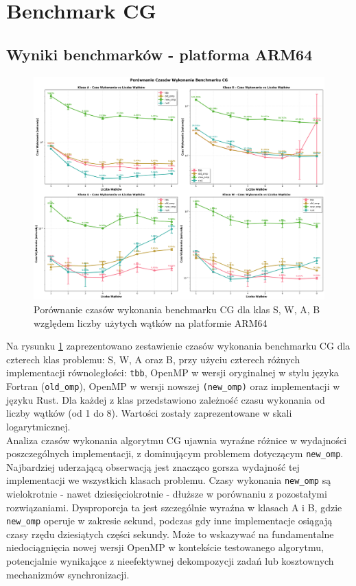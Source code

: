 
\section{Benchmark CG}
\subsection{Wyniki benchmarków - platforma ARM64}

\begin{figure}[H]
    \centering
    \includegraphics[width=\textwidth]{analiza/images/parallel/cg/arm/cg_porownanie_czasow_wykonania.png}
    \caption{Porównanie czasów wykonania benchmarku CG dla klas S, W, A, B względem liczby użytych wątków na platformie ARM64}
    \label{cg_porownanie_czasow_wykonania}
\end{figure}

Na rysunku \ref{cg_porownanie_czasow_wykonania} zaprezentowano zestawienie czasów wykonania benchmarku CG dla czterech klas problemu: S, W, A oraz B, przy użyciu czterech różnych implementacji równoległości: \texttt{tbb}, OpenMP w wersji oryginalnej w stylu języka Fortran (\texttt{old\_omp}), OpenMP w wersji nowszej \texttt{(\texttt{new\_omp})} oraz implementacji w języku Rust. Dla każdej z klas przedstawiono zależność czasu wykonania od liczby wątków (od 1 do 8). Wartości zostały zaprezentowane w skali logarytmicznej.\\
Analiza czasów wykonania algorytmu CG ujawnia wyraźne różnice w wydajności poszczególnych implementacji, z dominującym problemem dotyczącym \texttt{new\_omp}. Najbardziej uderzającą obserwacją jest znacząco gorsza wydajność tej implementacji we wszystkich klasach problemu. Czasy wykonania \texttt{new\_omp} są wielokrotnie - nawet dziesięciokrotnie - dłuższe w porównaniu z pozostałymi rozwiązaniami. Dysproporcja ta jest szczególnie wyraźna w klasach A i B, gdzie \texttt{new\_omp} operuje w zakresie sekund, podczas gdy inne implementacje osiągają czasy rzędu dziesiątych części sekundy. Może to wskazywać na fundamentalne niedociągnięcia nowej wersji OpenMP w kontekście testowanego algorytmu, potencjalnie wynikające z nieefektywnej dekompozycji zadań lub kosztownych mechanizmów synchronizacji.

